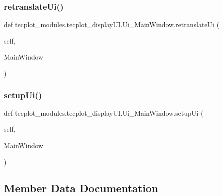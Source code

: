 \subsubsection{\texorpdfstring{retranslate\+Ui()}{retranslateUi()}}
{\footnotesize\ttfamily def tecplot\+\_\+modules.\+tecplot\+\_\+display\+U\+I.\+Ui\+\_\+\+Main\+Window.\+retranslate\+Ui (\begin{DoxyParamCaption}\item[{}]{self,  }\item[{}]{Main\+Window }\end{DoxyParamCaption})}

\hypertarget{classtecplot__modules_1_1tecplot__display_u_i_1_1_ui___main_window_a84d83568b72995fc1f091c00044adb72}{}\label{classtecplot__modules_1_1tecplot__display_u_i_1_1_ui___main_window_a84d83568b72995fc1f091c00044adb72} 
\subsubsection{\texorpdfstring{setup\+Ui()}{setupUi()}}
{\footnotesize\ttfamily def tecplot\+\_\+modules.\+tecplot\+\_\+display\+U\+I.\+Ui\+\_\+\+Main\+Window.\+setup\+Ui (\begin{DoxyParamCaption}\item[{}]{self,  }\item[{}]{Main\+Window }\end{DoxyParamCaption})}



\subsection{Member Data Documentation}
\hypertarget{classtecplot__modules_1_1tecplot__display_u_i_1_1_ui___main_window_a8806355d8f5b1e79e73c21d82b2a02b1}{}\label{classtecplot__modules_1_1tecplot__display_u_i_1_1_ui___main_window_a8806355d8f5b1e79e73c21d82b2a02b1} 
